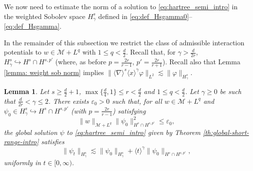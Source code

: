 \documentclass[12pt]{article}
\theoremstyle{plain}
\newtheorem{lemma}[theo]{Lemma}
\newcommand{\meas}{\mathcal{M}}
\begin{document}
We now need to estimate the norm of a solution to \eqref{eq:hartree_semi_intro}  in the weighted Sobolev space $H^s_\gamma$ defined in \eqref{eq:def_Hsgamma0}--\eqref{eq:def_Hsgamma}. 

 In the remainder of this subsection we restrict the class of admissible interaction potentials to $w\in \meas +L^q$ with $1\le q<\frac d2$.
Recall that, for $\gamma>\frac{d}{2r}$, $H^s_\gamma\hookrightarrow H^s\cap H^{s,p'}$ (where, as before $p=\frac{2r}{r-1}$, $p'=\frac{2r}{r+1}$). Recall also that Lemma \ref{lemma: weight sob norm} implies $  \|\langle\nabla\rangle^s \langle x\rangle^\gamma\varphi\|_{L^2}\lesssim \|\varphi\|_{H^s_\gamma}$. 
 
 
\begin{lemma}\label{lm:estim1_S}
    Let $s\ge\frac{d}{2}+1$, $\max \{\frac d4, 1\}\le r <\frac d2$ and $1 \le q< \frac d2$. Let  $\gamma\ge0$ be such that $\frac{d}{2r}<\gamma\le2$. There exists $\varepsilon_0>0$ such that, for all  $w \in \meas+L^{q}$ and $\psi_0\in H^s_\gamma\hookrightarrow H^s\cap H^{s,p'}$ (with $p=\frac{2r}{r-1}$) satisfying
		\begin{equation*}
			\|w\|_{\meas +L^{q}} \|\psi_0\|^2_{H^s\cap H^{s,p'}}\le\varepsilon_0,
		\end{equation*} 
		the global solution $\psi$ to \eqref{eq:hartree_semi_intro} given by Theorem \ref{th:global-short-range-intro} satisfies
		\begin{equation*}
		  \|\psi_t\|_{H^s_\gamma}\lesssim\|\psi_0\|_{H^s_\gamma}+\langle t\rangle^\gamma\|\psi_0\|_{H^s\cap H^{s,p'}},
		\end{equation*}
		uniformly in $t\in[0,\infty)$.
\end{lemma}
\end{document}
